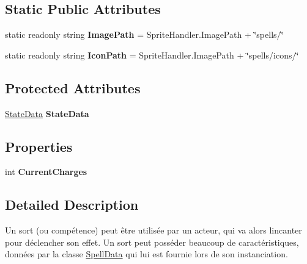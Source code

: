 \subsection*{Static Public Attributes}
\begin{DoxyCompactItemize}
\item 
\mbox{\label{class_tentacle_slicers_1_1spells_1_1_spell_a7c5892c8fcafec6af838959d0c514ffc}} 
static readonly string {\bfseries Image\+Path} = Sprite\+Handler.\+Image\+Path + \char`\"{}spells/\char`\"{}
\item 
\mbox{\label{class_tentacle_slicers_1_1spells_1_1_spell_ae349ff2985f1ba6f8127d717b600d311}} 
static readonly string {\bfseries Icon\+Path} = Sprite\+Handler.\+Image\+Path + \char`\"{}spells/icons/\char`\"{}
\end{DoxyCompactItemize}
\subsection*{Protected Attributes}
\begin{DoxyCompactItemize}
\item 
\mbox{\label{class_tentacle_slicers_1_1spells_1_1_spell_ab404e5359ddf25d5e44888e90b5bb505}} 
\hyperlink{class_tentacle_slicers_1_1states_1_1_state_data}{State\+Data} {\bfseries State\+Data}
\end{DoxyCompactItemize}
\subsection*{Properties}
\begin{DoxyCompactItemize}
\item 
\mbox{\label{class_tentacle_slicers_1_1spells_1_1_spell_a8618857aa0cc73addf8dcb61de41cef7}} 
int {\bfseries Current\+Charges}
\end{DoxyCompactItemize}


\subsection{Detailed Description}
Un sort (ou compétence) peut être utilisée par un acteur, qui va alors l\textquotesingle{}incanter pour déclencher son effet. Un sort peut posséder beaucoup de caractéristiques, données par la classe \hyperlink{class_tentacle_slicers_1_1spells_1_1_spell_data}{Spell\+Data} qui lui est fournie lors de son instanciation. 



